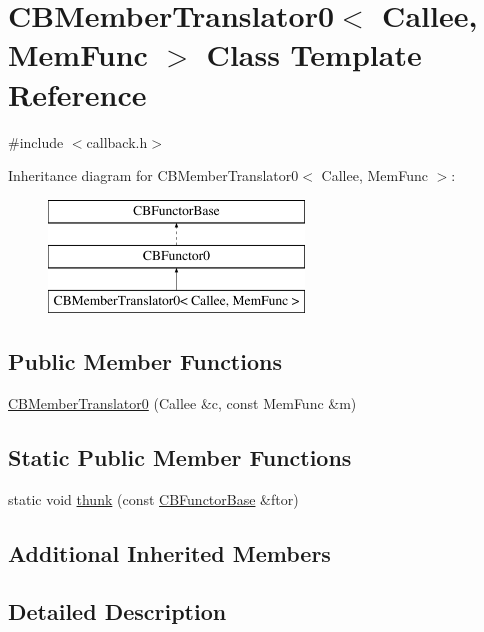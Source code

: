 \hypertarget{class_c_b_member_translator0}{\section{C\+B\+Member\+Translator0$<$ Callee, Mem\+Func $>$ Class Template Reference}
\label{class_c_b_member_translator0}
}


{\ttfamily \#include $<$callback.\+h$>$}

Inheritance diagram for C\+B\+Member\+Translator0$<$ Callee, Mem\+Func $>$\+:\begin{figure}[H]
\begin{center}
\leavevmode
\includegraphics[height=3.000000cm]{class_c_b_member_translator0}
\end{center}
\end{figure}
\subsection*{Public Member Functions}
\begin{DoxyCompactItemize}
\item 
\hyperlink{class_c_b_member_translator0_af242b8ca6be0ecabc13c0c9b8ae4a855}{C\+B\+Member\+Translator0} (Callee \&c, const Mem\+Func \&m)
\end{DoxyCompactItemize}
\subsection*{Static Public Member Functions}
\begin{DoxyCompactItemize}
\item 
static void \hyperlink{class_c_b_member_translator0_a0c48ec67cc966a40be1b0c47979f5cb5}{thunk} (const \hyperlink{class_c_b_functor_base}{C\+B\+Functor\+Base} \&ftor)
\end{DoxyCompactItemize}
\subsection*{Additional Inherited Members}


\subsection{Detailed Description}
